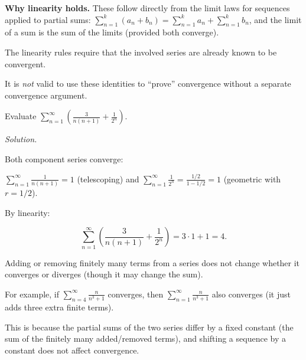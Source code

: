 \noindent
\textbf{Why linearity holds.}
These follow directly from the limit laws for sequences applied to partial sums:
$\sum_{n=1}^{k}(a_n+b_n)=\sum_{n=1}^{k}a_n+\sum_{n=1}^{k}b_n$, and the limit of a sum is the sum of the limits (provided both converge).

\begin{commonmistake}

The linearity rules require that the involved series are already known to be convergent.

It is \emph{not} valid to use these identities to ``prove'' convergence without a separate convergence argument.

\end{commonmistake}

\begin{examplebox}[title={Worked Example (Lecture Example 4.26): combining series}]

Evaluate $\displaystyle \sum_{n=1}^{\infty}\left(\frac{3}{n(n+1)}+\frac{1}{2^n}\right)$.

\emph{Solution.}

Both component series converge:

$\displaystyle\sum_{n=1}^{\infty}\frac{1}{n(n+1)}=1$ (telescoping) and $\displaystyle\sum_{n=1}^{\infty}\frac{1}{2^n}=\frac{1/2}{1-1/2}=1$ (geometric with $r=1/2$).

By linearity:

\[
\sum_{n=1}^{\infty}\left(\frac{3}{n(n+1)}+\frac{1}{2^n}\right)
= 3\cdot 1 + 1 = \boxed{4}.
\]

\end{examplebox}

\begin{examtip}[title={Exam Focus: Finite number of terms does not affect convergence}]

Adding or removing finitely many terms from a series does not change whether it converges or diverges (though it may change the sum).

For example, if $\sum_{n=4}^{\infty}\frac{n}{n^3+1}$ converges, then $\sum_{n=1}^{\infty}\frac{n}{n^3+1}$ also converges (it just adds three extra finite terms).

This is because the partial sums of the two series differ by a fixed constant (the sum of the finitely many added/removed terms), and shifting a sequence by a constant does not affect convergence.

\end{examtip}

